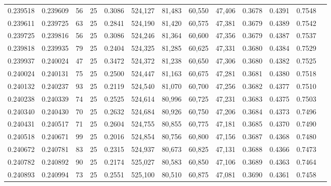 \begin{tabular}{rrrrrrrrrrrrr}
0.239518 & 0.239609 &    56 &  25 &                                     0.3086 & 524,127 &  81,483 &  60,550 &  47,406 & 0.3678 & 0.4391 & 0.7548 \\
0.239611 & 0.239725 &    63 &  25 &                                     0.2841 & 524,190 &  81,420 &  60,575 &  47,381 & 0.3679 & 0.4389 & 0.7542 \\
0.239725 & 0.239816 &    56 &  25 &                                     0.3086 & 524,246 &  81,364 &  60,600 &  47,356 & 0.3679 & 0.4387 & 0.7537 \\
0.239818 & 0.239935 &    79 &  25 &                                     0.2404 & 524,325 &  81,285 &  60,625 &  47,331 & 0.3680 & 0.4384 & 0.7529 \\
0.239937 & 0.240024 &    47 &  25 &                                     0.3472 & 524,372 &  81,238 &  60,650 &  47,306 & 0.3680 & 0.4382 & 0.7525 \\
0.240024 & 0.240131 &    75 &  25 &                                     0.2500 & 524,447 &  81,163 &  60,675 &  47,281 & 0.3681 & 0.4380 & 0.7518 \\
0.240132 & 0.240237 &    93 &  25 &                                     0.2119 & 524,540 &  81,070 &  60,700 &  47,256 & 0.3682 & 0.4377 & 0.7510 \\
0.240238 & 0.240339 &    74 &  25 &                                     0.2525 & 524,614 &  80,996 &  60,725 &  47,231 & 0.3683 & 0.4375 & 0.7503 \\
0.240340 & 0.240430 &    70 &  25 &                                     0.2632 & 524,684 &  80,926 &  60,750 &  47,206 & 0.3684 & 0.4373 & 0.7496 \\
0.240431 & 0.240517 &    71 &  25 &                                     0.2604 & 524,755 &  80,855 &  60,775 &  47,181 & 0.3685 & 0.4370 & 0.7490 \\
0.240518 & 0.240671 &    99 &  25 &                                     0.2016 & 524,854 &  80,756 &  60,800 &  47,156 & 0.3687 & 0.4368 & 0.7480 \\
0.240672 & 0.240781 &    83 &  25 &                                     0.2315 & 524,937 &  80,673 &  60,825 &  47,131 & 0.3688 & 0.4366 & 0.7473 \\
0.240782 & 0.240892 &    90 &  25 &                                     0.2174 & 525,027 &  80,583 &  60,850 &  47,106 & 0.3689 & 0.4363 & 0.7464 \\
0.240893 & 0.240994 &    73 &  25 &                                     0.2551 & 525,100 &  80,510 &  60,875 &  47,081 & 0.3690 & 0.4361 & 0.7458 \\

\end{tabular}
